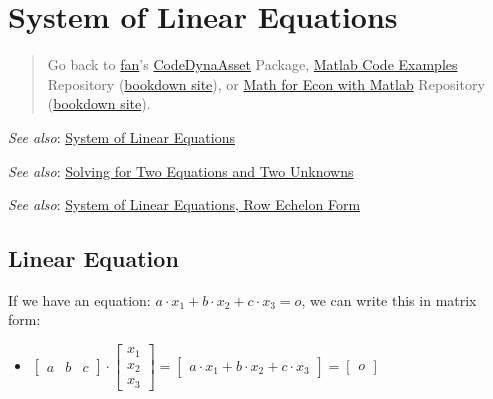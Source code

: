 \documentclass[
]{book}
\providecommand{\tightlist}{%
  \setlength{\itemsep}{0pt}\setlength{\parskip}{0pt}}
\begin{document}
\hypertarget{system-of-linear-equations}{%
\section{System of Linear Equations}\label{system-of-linear-equations}}

\begin{quote}
Go back to \href{http://fanwangecon.github.io/}{fan}'s \href{https://fanwangecon.github.io/CodeDynaAsset/}{CodeDynaAsset} Package, \href{https://fanwangecon.github.io/M4Econ/}{Matlab Code Examples} Repository (\href{https://fanwangecon.github.io/M4Econ/bookdown}{bookdown site}), or \href{https://fanwangecon.github.io/Math4Econ/}{Math for Econ with Matlab} Repository (\href{https://fanwangecon.github.io/Math4Econ/bookdown}{bookdown site}).
\end{quote}

\emph{See also}: \href{https://fanwangecon.github.io/Math4Econ/matrix_system_of_equations/matrix_linear_equations.html}{System of Linear
Equations}

\emph{See also}: \href{https://fanwangecon.github.io/Math4Econ/matrix_system_of_equations/matrix_linear_system_2.html}{Solving for Two Equations and Two
Unknowns}

\emph{See also}: \href{https://fanwangecon.github.io/Math4Econ/matrix_system_of_equations/matrix_row_echelon_form.html}{System of Linear Equations, Row Echelon
Form}

\hypertarget{linear-equation}{%
\subsection{Linear Equation}\label{linear-equation}}

If we have an equation: \(a\cdot x_1 +b\cdot x_2 +c\cdot x_3 =o\), we can
write this in matrix form:

\begin{itemize}
\tightlist
\item
  \(\displaystyle \left\lbrack \begin{array}{ccc} a & b & c \end{array}\right\rbrack \cdot \left\lbrack \begin{array}{c} x_1 \\ x_2 \\ x_3 \end{array}\right\rbrack =\left\lbrack \begin{array}{cc} a\cdot x_1 +b\cdot x_2 +c\cdot x_3 \end{array}\right\rbrack =\left\lbrack \begin{array}{c} o \end{array}\right\rbrack\)
\end{itemize}
\end{document}
